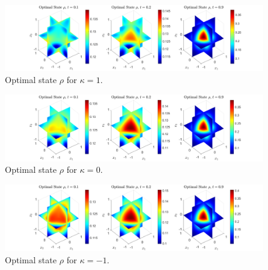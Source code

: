 \documentclass[11pt, a4paper]{article}
\theoremstyle{definition}
\begin{document}
	\begin{figure}[h]
		\centering
		\includegraphics[scale=0.35]{rho3Dk1n.png}
		\caption{Optimal state $\rho$ for $\kappa = 1$.} 
		\label{F2}
	\end{figure}
	\begin{figure}[h]
		\centering
		\includegraphics[scale=0.35]{rho3Dk0n.png}
		\caption{Optimal state $\rho$ for $\kappa = 0$.} 
		\label{F3}
	\end{figure}
	\begin{figure}[h]
		\centering
		\includegraphics[scale=0.35]{rho3Dkn1n.png}
		\caption{Optimal state $\rho$ for $\kappa = -1$.} 
		\label{F4}
	\end{figure}
	
\end{document}
